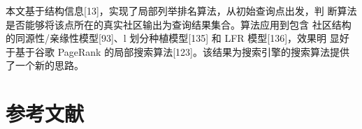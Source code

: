 \documentclass[a4paper]{apa6}
\begin{document}
本文基于结构信息[13]，实现了局部列举排名算法，从初始查询点出发，判 断算法是否能够将该点所在的真实社区输出为查询结果集合。算法应用到包含 社区结构的同源性/亲缘性模型[93]、l 划分种植模型[135] 和 LFR 模型[136]，效果明 显好于基于谷歌 PageRank 的局部搜索算法[123]。该结果为搜索引擎的搜索算法提供了一个新的思路。

\section{参考文献}
\label{sec:orgded7af5}


\end{document}
